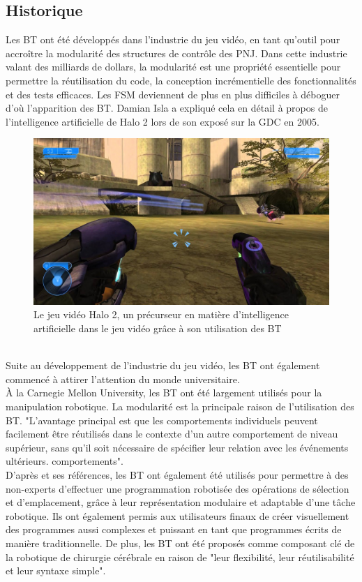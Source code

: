 \documentclass[titlepage]{article}
\begin{document}
		\subsection{Historique}
			Les BT ont été développés dans l’industrie du jeu vidéo, en tant qu’outil pour accroître la modularité des structures de contrôle des PNJ. Dans cette industrie valant des milliards de dollars, la modularité est une propriété essentielle pour permettre la réutilisation du code, la conception incrémentielle des fonctionnalités et des tests efficaces. Les FSM deviennent de plus en plus difficiles à déboguer d'où l'apparition des BT. Damian Isla a expliqué cela en détail à propos de l’intelligence artificielle de Halo 2 lors de son exposé sur la GDC en 2005. \cite{gdc_2005}
			\\
			\begin{figure}[h!]
				\includegraphics[width=\linewidth]{img/halo2.jpg}
				\caption{Le jeu vidéo Halo 2, un précurseur en matière d'intelligence artificielle dans le jeu vidéo grâce à son utilisation des BT \cite{wikipedia_halo}}
				\label{fig:BT1}
			\end{figure}
			\\
			Suite au développement de l'industrie du jeu vidéo, les BT ont également commencé à attirer l'attention du monde universitaire.
			\\
			À la Carnegie Mellon University, les BT ont été largement utilisés pour la manipulation robotique. La modularité est la principale raison de l'utilisation des BT. "L'avantage principal est que les comportements individuels peuvent facilement être réutilisés dans le contexte d'un autre comportement de niveau supérieur, sans qu'il soit nécessaire de spécifier leur relation avec les événements ultérieurs. comportements".\cite{Bagnell_2012_7606}
			\\
			D'après \cite{colledanchise_2017} et ses références, les BT ont également été utilisés pour permettre à des non-experts d’effectuer une programmation robotisée des opérations de sélection et d’emplacement, grâce à leur représentation modulaire et adaptable d’une tâche robotique. Ils ont également permis aux utilisateurs finaux de créer visuellement des programmes aussi complexes et puissant en tant que programmes écrits de manière traditionnelle. De plus, les BT ont été proposés comme composant clé de la robotique de chirurgie cérébrale en raison de "leur flexibilité, leur réutilisabilité et leur syntaxe simple".\cite{hu_gong_hannaford_seibel_2015}
	\clearpage
\end{document}
